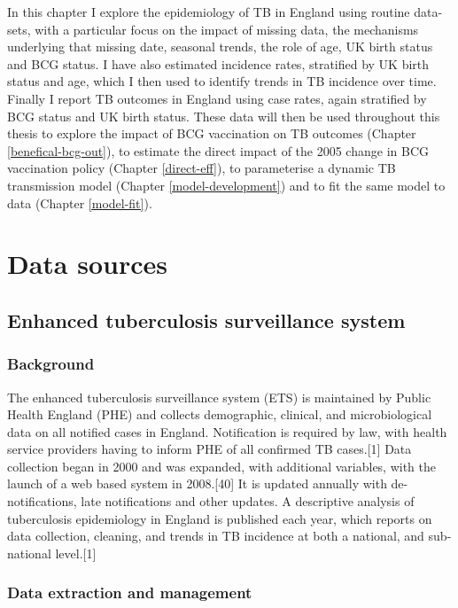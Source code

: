 \documentclass[11pt,twoside]{bristolthesis}
\begin{document}
  In this chapter I explore the epidemiology of TB in England using routine data-sets, with a particular focus on the impact of missing data, the mechanisms underlying that missing date, seasonal trends, the role of age, UK birth status and BCG status. I have also estimated incidence rates, stratified by UK birth status and age, which I then used to identify trends in TB incidence over time. Finally I report TB outcomes in England using case rates, again stratified by BCG status and UK birth status. These data will then be used throughout this thesis to explore the impact of BCG vaccination on TB outcomes (Chapter \ref{benefical-bcg-out}), to estimate the direct impact of the 2005 change in BCG vaccination policy (Chapter \ref{direct-eff}), to parameterise a dynamic TB transmission model (Chapter \ref{model-development}) and to fit the same model to data (Chapter \ref{model-fit}).
  
  \hypertarget{data-sources}{%
  \section{Data sources}\label{data-sources}}
  
  \hypertarget{ets-deep-dive}{%
  \subsection{Enhanced tuberculosis surveillance system}\label{ets-deep-dive}}
  
  \hypertarget{background-1}{%
  \subsubsection{Background}\label{background-1}}
  
  The enhanced tuberculosis surveillance system (ETS) is maintained by Public Health England (PHE) and collects demographic, clinical, and microbiological data on all notified cases in England. Notification is required by law, with health service providers having to inform PHE of all confirmed TB cases.{[}1{]} Data collection began in 2000 and was expanded, with additional variables, with the launch of a web based system in 2008.{[}40{]} It is updated annually with de-notifications, late notifications and other updates. A descriptive analysis of tuberculosis epidemiology in England is published each year, which reports on data collection, cleaning, and trends in TB incidence at both a national, and sub-national level.{[}1{]}
  
  \hypertarget{data-extraction-and-management}{%
  \subsubsection{Data extraction and management}\label{data-extraction-and-management}}
  
\end{document}
